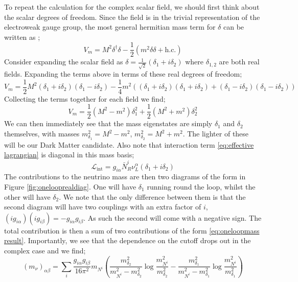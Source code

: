 \documentclass[11pt]{article}
\numberwithin{equation}{section}
\numberwithin{figure}{section}
\numberwithin{table}{section}
\newcommand{\dagg}{^{\dagger}}
\newcommand{\mL}{\mathcal{L}}
\begin{document}
To repeat the calculation for the complex scalar field, we should first think about the scalar degrees of freedom. Since the field is in the trivial representation of the electroweak gauge group, the most general hermitian mass term for $\delta$ can be written as \cite{Farzan2010};
\begin{equation}
  V_m = M^2 \delta\dagg \delta - \frac{1}{2}(m^2 \delta\delta + \text{h.c.})
\end{equation}
Consider expanding the scalar field as $\delta = \tfrac{1}{\sqrt{2}}(\delta_1 + i\delta_2)$ where $\delta_{1,2}$ are both real fields. Expanding the terms above in terms of these real degrees of freedom;
\begin{dmath}
  V_m = \frac{1}{2}M^2(\delta_1 + i\delta_2)(\delta_1 - i\delta_2) - \frac{1}{4}m^2\left((\delta_1 + i\delta_2)(\delta_1 + i\delta_2) + (\delta_1 - i\delta_2)(\delta_1 - i\delta_2)\right)
\end{dmath}
Collecting the terms together for each field we find;
\begin{equation}
  V_m = \frac{1}{2}(M^2 - m^2)\delta_1^2 + \frac{1}{2}(M^2 + m^2)\delta_2^2
\end{equation}
We can then immediately see that the mass eigenstates are simply $\delta_1$ and $\delta_2$ themselves, with masses $m^2_{\delta_1} = M^2 - m^2$, $m^2_{\delta_2} = M^2 + m^2$. The lighter of these will be our Dark Matter candidate. Also note that interaction term \eqref{eq:effective lagrangian} is diagonal in this mass basis;
\begin{equation}
  \mL_{\text{int}} = g_{i\alpha}\bar{N}^i_R \nu^\alpha_L (\delta_1 + i \delta_2)
\end{equation}
The contributions to the neutrino mass are then two diagrams of the form in Figure \ref{fig:onelooprealdiag}. One will have $\delta_1$ running round the loop, whilst the other will have $\delta_2$. We note that the only difference between them is that the second diagram will have two couplings with an extra factor of $i$, $(ig_{i\alpha})(ig_{i\beta}) = -g_{i\alpha}g_{i\beta}$. As such the second will come with a negative sign. The total contribution is then a sum of two contributions of the form \eqref{eq:oneloopmass result}. Importantly, we see that the dependence on the cutoff drops out in the complex case and we find;
\begin{equation}
  (m_\nu)_{\alpha\beta} = \sum_{i}{\frac{g_{i\alpha}g_{i\beta}}{16\pi^2}m_{N^i}\left(\frac{m_{\delta_2}^2}{m_{N^i}^2 - m_{\delta_2}^2}\log\frac{m_{N^i}^2}{m_{\delta_2}^2} - \frac{m_{\delta_1}^2}{m_{N^i}^2 - m_{\delta_1}^2}\log\frac{m_{N^i}^2}{m_{\delta_1}^2}\right)}
\end{equation}
\end{document}
